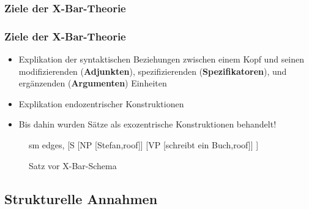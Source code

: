 \subsubsection{Ziele der X-Bar-Theorie}



\begin{frame}
\frametitle{Ziele der X-Bar-Theorie}

\begin{itemize}
	\item Explikation der syntaktischen Beziehungen zwischen einem Kopf und seinen modifizierenden (\textbf{Adjunkten}), spezifizierenden (\textbf{Spezifikatoren}), und ergänzenden (\textbf{Argumenten}) Einheiten
	\item Explikation endozentrischer Konstruktionen
	\item Bis dahin wurden Sätze als exozentrische Konstruktionen behandelt!
\end{itemize}

\begin{figure}[b]
	\begin{minipage}[b]{0.05\textwidth}
	\end{minipage} 
	\begin{minipage}[b]{0.50\textwidth}
	\centering
	\footnotesize{
		\begin{forest}
		sm edges,
		[S	[NP [Stefan,roof]]
			[VP [schreibt ein Buch,roof]]
		]
		\end{forest}
		}
		\caption{Satz vor X-Bar-Schema}	
  	\end{minipage}  
	\begin{minipage}[b]{0.05\textwidth}
  	\end{minipage}
  	
\end{figure}

\end{frame}


\subsection{Strukturelle Annahmen}

